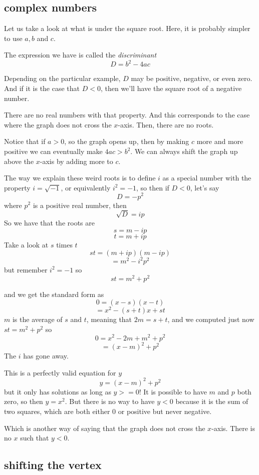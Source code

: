 \documentclass[11pt, oneside]{article}
\begin{document}
\subsection*{complex numbers}
Let us take a look at what is under the square root.  Here, it is probably simpler to use $a,b$ and $c$.  

The expression we have is called the \emph{discriminant}
\[ D = b^2 - 4ac \]

Depending on the particular example, $D$ may be positive, negative, or even zero.  And if it is the case that $D < 0$, then we'll have the square root of a negative number.

There are no real numbers with that property.  And this corresponds to the case where the graph does not cross the $x$-axis.  Then, there are no roots.

Notice that if $a > 0$, so the graph opens up, then by making $c$ more and more positive we can eventually make $4ac > b^2$.  We can always shift the graph up above the $x$-axis by adding more to $c$.

The way we explain these weird roots is to define $i$ as a special number with the property $i = \sqrt{-1}$, or equivalently $i^2 = -1$, so then if $D < 0$, let's say
\[ D = -p^2 \]
where $p^2$ is a positive real number, then
\[ \sqrt{D} = ip \]
So we have that the roots are
\[ s = m - ip \]
\[ t = m + ip \]
Take a look at $s$ times $t$
\[ st = (m + ip)(m - ip) \]
\[ = m^2 - i^2 p^2 \]
but remember $i^2 = -1$ so
\[ st = m^2 + p^2 \]

and we get the standard form as
\[ 0 =  (x - s)(x - t) \]
\[ = x^2 - (s + t)x + st \]
$m$ is the average of $s$ and $t$, meaning that $2m = s + t$, and we computed just now $st = m^2 + p^2$ so
\[ 0 = x^2 - 2m + m^2 + p^2 \]
\[ = (x - m)^2 + p^2 \]
The $i$ has gone away.

This is a perfectly valid equation for $y$
\[ y = (x - m)^2 + p^2 \]
but it only has solutions as long as $y >= 0$!  It is possible to have $m$ and $p$ both zero, so then $y = x^2$.  But there is no way to have $y < 0$ because it is the sum of two squares, which are both either $0$ or positive but never negative.

Which is another way of saying that the graph does not cross the $x$-axis.  There is no $x$ such that $y < 0$.

\subsection*{shifting the vertex}
\end{document}
